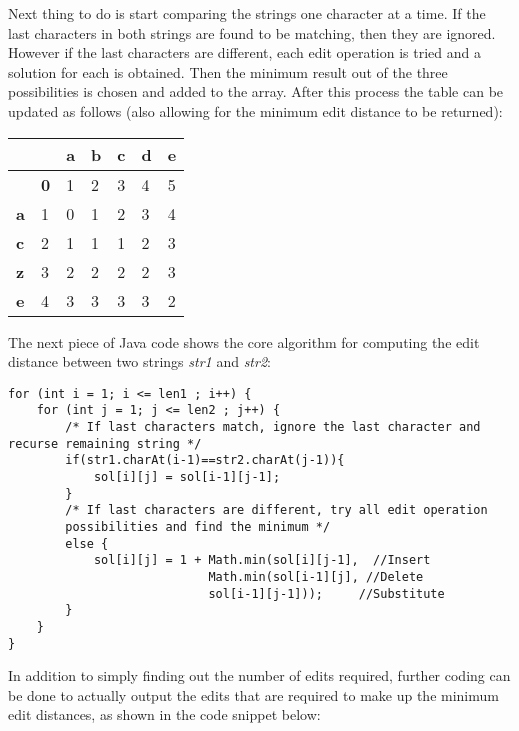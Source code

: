 Next thing to do is start comparing the strings one character at a time. If the last characters in both strings are found to be matching, then they are ignored. However if the last characters are different, each edit operation is tried and a solution for each is obtained. Then the minimum result out of the three possibilities is chosen and added to the array. After this process the table can be updated as follows (also allowing for the minimum edit distance to be returned):
\begin{table}[]
	\centering
	\begin{tabular}{|l|l|l|l|l|l|l|}
		\hline
		&  & \textbf{a} & \textbf{b} & \textbf{c} & \textbf{d} & \textbf{e} \\ \hline
		\textbf{} & \textbf{0} & 1 & 2 & 3 & 4 & 5 \\ \hline
		\textbf{a} & 1 & 0 & 1 & 2 & 3 & 4 \\ \hline
		\textbf{c} & 2 & 1 & 1 & 1 & 2 & 3 \\ \hline
		\textbf{z} & 3 & 2 & 2 & 2 & 2 & 3 \\ \hline
		\textbf{e} & 4 & 3 & 3 & 3 & 3 & 2 \\ \hline
	\end{tabular}
\end{table}


\smallbreak\noindent
The next piece of Java code shows the core algorithm for computing the edit distance between two strings \textit{str1} and \textit{str2}:

\begin{lstlisting}
for (int i = 1; i <= len1 ; i++) {
	for (int j = 1; j <= len2 ; j++) {
		/* If last characters match, ignore the last character and recurse remaining string */
		if(str1.charAt(i-1)==str2.charAt(j-1)){
			sol[i][j] = sol[i-1][j-1];
		}
		/* If last characters are different, try all edit operation 
		possibilities and find the minimum */
		else {
			sol[i][j] = 1 + Math.min(sol[i][j-1],  //Insert
							Math.min(sol[i-1][j], //Delete
							sol[i-1][j-1]));     //Substitute
		}
	}
}
\end{lstlisting}

In addition to simply finding out the number of edits required, further coding can be done to actually output the edits that are required to make up the minimum edit distances, as shown in the code snippet below:


